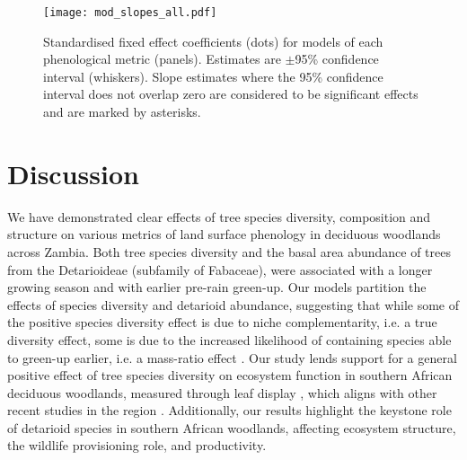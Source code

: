 \documentclass[11pt,a4paper]{article}
\begin{document}
\begin{figure}[H]
\centering
	\texttt{[image: mod\_slopes\_all.pdf]}
	\caption{Standardised fixed effect coefficients (dots) for models of each
		phenological metric (panels). Estimates are $\pm$95\% confidence interval (whiskers).
		Slope estimates where the 95\% confidence interval does not overlap zero are considered to be
		significant effects and are marked by asterisks.}
	\label{mod_slopes}
\end{figure}

\section{Discussion}

We have demonstrated clear effects of tree species diversity, composition and
structure on various metrics of land surface phenology in deciduous woodlands
across Zambia. Both tree species diversity and the basal area abundance of
trees from the Detarioideae (subfamily of Fabaceae), were associated with a
longer growing season and with earlier pre-rain green-up. Our models partition the effects of species diversity and
detarioid abundance, suggesting that while some of the positive species
diversity effect is due to niche complementarity, i.e. a true diversity effect,
some is due to the increased likelihood of containing species able to green-up
earlier, i.e. a mass-ratio effect \citep{Grime1998, Tilman2014}. Our study
lends support for a general positive effect of tree species diversity on
ecosystem function in southern African deciduous woodlands, measured through
leaf display \citep{Richardson2009}, which aligns with other recent studies in
the region \citep{Godlee2021, McNicol2018, Shirima2015}. Additionally, our
results highlight the keystone role of detarioid species in southern African
woodlands, affecting ecosystem structure, the wildlife provisioning role, and
productivity.
\end{document}
